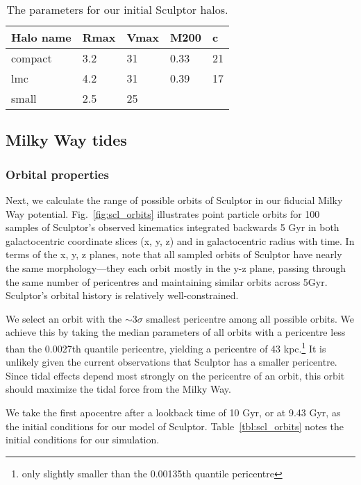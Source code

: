 \begin{table*}[t]
\centering
\caption[Initial halos of Sculptor]{The parameters for our initial Sculptor halos. }
\label{tbl:scl_ini_halos}
\begin{tabular}{lllll}
\toprule
Halo name & Rmax & Vmax & M200 & c\\
\midrule
compact & 3.2 & 31 & 0.33 & 21\\
lmc & 4.2 & 31 & 0.39 & 17\\
small & 2.5 & 25 &  & \\
\bottomrule
\end{tabular}
\end{table*}

\subsection{Milky Way tides}\label{milky-way-tides}

\subsubsection{Orbital properties}\label{orbital-properties}

Next, we calculate the range of possible orbits of Sculptor in our
fiducial Milky Way potential. Fig.~\ref{fig:scl_orbits} illustrates
point particle orbits for 100 samples of Sculptor's observed kinematics
integrated backwards 5 Gyr in both galactocentric coordinate slices (x,
y, z) and in galactocentric radius with time. In terms of the x, y, z
planes, note that all sampled orbits of Sculptor have nearly the same
morphology---they each orbit mostly in the y-z plane, passing through
the same number of pericentres and maintaining similar orbits across
5Gyr. Sculptor's orbital history is relatively well-constrained.

We select an orbit with the \(\sim 3\sigma\) smallest pericentre among
all possible orbits. We achieve this by taking the median parameters of
all orbits with a pericentre less than the 0.0027th quantile pericentre,
yielding a pericentre of 43 kpc.\footnote{only slightly smaller than the
  0.00135th quantile pericentre} It is unlikely given the current
observations that Sculptor has a smaller pericentre. Since tidal effects
depend most strongly on the pericentre of an orbit, this orbit should
maximize the tidal force from the Milky Way.

We take the first apocentre after a lookback time of 10 Gyr, or at 9.43
Gyr, as the initial conditions for our model of Sculptor.
Table~\ref{tbl:scl_orbits} notes the initial conditions for our
simulation.

